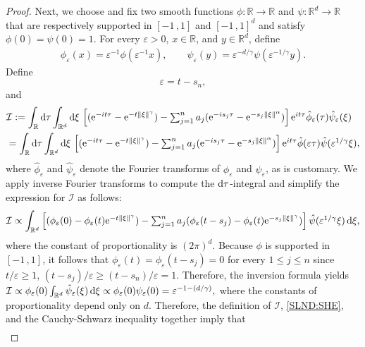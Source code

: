 \documentclass[reqno]{amsart}
\newcommand{\<}{\langle}
\renewcommand{\>}{\rangle}
\newcommand{\R}{\mathbb{R}}
\newcommand{\1}{\mathbb{1}}
\renewcommand{\d}{{\rm d}}
\newcommand{\e}{{\rm e}}
\renewcommand{\ge}{\geqslant}
\renewcommand{\le}{\leqslant}
\theoremstyle{definition}
\numberwithin{equation}{section}
\begin{document}
\begin{proof}
	Next, we choose and fix two smooth functions $\phi: \R \to \R$ 
	and $\psi:\R^d\to\R$ that are respectively supported in $[-1\,,1]$ 
	and $[-1\,,1]^d$ and satisfy $\phi(0) = \psi(0) = 1$.
	For every $\varepsilon>0$, $x\in\R$, and $y\in\R^d$, define 
	\begin{align*}
		\phi_\varepsilon(x) = \varepsilon^{-1}\phi(\varepsilon^{-1}x),
		\qquad
		\psi_\varepsilon(y) = \varepsilon^{-d/\gamma}\psi(\varepsilon^{-1/\gamma}y).
	\end{align*}
	Define
	\begin{equation}\label{epsilon}
		\varepsilon =t-s_n,
	\end{equation}
	and
	\begin{align*}
		&\mathcal{I} := \int_{\R} \d\tau \int_{\R^d}\d \xi\, 
			\textstyle\left[ (\e^{-it\tau} - \e^{-t\| \xi \|^\gamma}) 
			- \sum_{j=1}^n a_j (\e^{-is_j\tau}-\e^{-s_j \|\xi \|^\alpha}) \right] 
			\e^{it\tau} \hat{\phi}_\varepsilon(\tau) \hat{\psi}_\varepsilon(\xi)\\
		&= \int_{\R} \d\tau \int_{\R^d}\d \xi\, 
			\textstyle\left[ (\e^{-it\tau} - \e^{-t\| \xi \|^\gamma}) 
			- \sum_{j=1}^n a_j (\e^{-is_j\tau}-\e^{-s_j \|\xi \|^\alpha}) \right] 
			\e^{it\tau} \hat{\phi}(\varepsilon \tau) \hat{\psi}(\varepsilon^{1/\gamma} \xi),
	\end{align*}
	where $\hat{\phi}_\varepsilon$ and $\hat{\psi}_\varepsilon$
	denote the Fourier transforms of $\phi_\varepsilon$ and $\psi_\varepsilon$,
	as is customary. We apply inverse Fourier transforms to compute the
	$\d\tau$-integral
	and simplify the expression for $\mathcal{I}$ as follows:
	\[
		\mathcal{I} \propto  \int_{\R^d}
		\textstyle\left[ 
		(\phi_{\varepsilon}(0)-\phi_{\varepsilon}(t) \e^{-t \| \xi\|^\gamma}) 
		- \sum_{j=1}^n a_j (\phi_\varepsilon(t-s_j) - \phi_\varepsilon(t) 
		\e^{-s_j\| \xi \|^\gamma}) \right] \hat{\psi}(\varepsilon^{1/\gamma} \xi)\,\d\xi,
	\]
	where the constant of proportionality is $(2\pi)^d$.
	Because $\phi$ is supported in $[-1\,,1]$, it follows that
	$\phi_\varepsilon(t) = \phi_\varepsilon(t-s_j)=0$ 
	for every $1 \le j \le n$ since $t/\varepsilon \ge 1$, $(t-s_j)/\varepsilon \ge 
	(t-s_n)/\varepsilon = 1$. Therefore, the inversion formula yields
	$\mathcal{I} \propto \phi_\varepsilon(0) \int_{\R^d} \hat{\psi}_\varepsilon (\xi) \,\d \xi
	\propto \phi_\varepsilon(0) \psi_\varepsilon (0) = \varepsilon^{-1-(d/\gamma)},$
	where the constants of proportionality depend only on $d$. 
	Therefore, the definition of $\mathcal{I}$, \eqref{SLND:SHE},
	and the Cauchy-Schwarz inequality together imply that
	\begin{align}

\end{align}
\end{proof}
\end{document}
